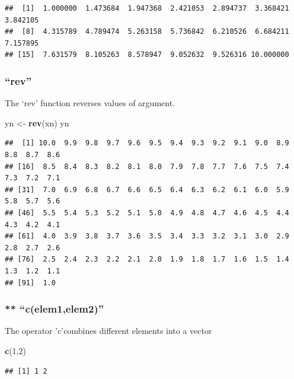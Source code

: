 \documentclass[]{article}
\newenvironment{Shaded}{\begin{snugshade}}{\end{snugshade}}
\newcommand{\DecValTok}[1]{\textcolor[rgb]{0.00,0.00,0.81}{#1}}
\newcommand{\KeywordTok}[1]{\textcolor[rgb]{0.13,0.29,0.53}{\textbf{#1}}}
\newcommand{\NormalTok}[1]{#1}
\newcommand{\StringTok}[1]{\textcolor[rgb]{0.31,0.60,0.02}{#1}}
\begin{document}
\begin{verbatim}
##  [1]  1.000000  1.473684  1.947368  2.421053  2.894737  3.368421  3.842105
##  [8]  4.315789  4.789474  5.263158  5.736842  6.210526  6.684211  7.157895
## [15]  7.631579  8.105263  8.578947  9.052632  9.526316 10.000000
\end{verbatim}

\hypertarget{rev}{%
\subsubsection{``rev''}\label{rev}}

The `rev' function reverses values of argument.

\begin{Shaded}
\begin{Highlighting}[]
\NormalTok{yn <-}\StringTok{ }\KeywordTok{rev}\NormalTok{(xn)}
\NormalTok{yn}
\end{Highlighting}
\end{Shaded}

\begin{verbatim}
##  [1] 10.0  9.9  9.8  9.7  9.6  9.5  9.4  9.3  9.2  9.1  9.0  8.9  8.8  8.7  8.6
## [16]  8.5  8.4  8.3  8.2  8.1  8.0  7.9  7.8  7.7  7.6  7.5  7.4  7.3  7.2  7.1
## [31]  7.0  6.9  6.8  6.7  6.6  6.5  6.4  6.3  6.2  6.1  6.0  5.9  5.8  5.7  5.6
## [46]  5.5  5.4  5.3  5.2  5.1  5.0  4.9  4.8  4.7  4.6  4.5  4.4  4.3  4.2  4.1
## [61]  4.0  3.9  3.8  3.7  3.6  3.5  3.4  3.3  3.2  3.1  3.0  2.9  2.8  2.7  2.6
## [76]  2.5  2.4  2.3  2.2  2.1  2.0  1.9  1.8  1.7  1.6  1.5  1.4  1.3  1.2  1.1
## [91]  1.0
\end{verbatim}

\hypertarget{celem1elem2}{%
\subsubsection{** ``c(elem1,elem2)''}\label{celem1elem2}}

The operator 'c'combines different elements into a vector

\begin{Shaded}
\begin{Highlighting}[]
\KeywordTok{c}\NormalTok{(}\DecValTok{1}\NormalTok{,}\DecValTok{2}\NormalTok{)}
\end{Highlighting}
\end{Shaded}

\begin{verbatim}
## [1] 1 2
\end{verbatim}
\end{document}

